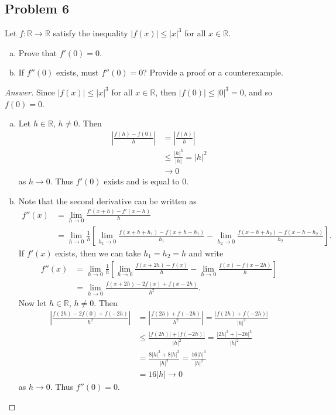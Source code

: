 \documentclass[12pt]{article}
\newcommand{\real}{\mathbb{R}}
\newcommand{\sqbrack}[1]{\left [ #1 \right ]}
\theoremstyle{definition}
\begin{document}
\subsection{Problem 6}
Let $f : \real \to \real$ satisfy the inequality $|f(x)| \leq \left| x \right|^3$ for all $x \in \real$.
\begin{enumerate}[(a)]
    \item Prove that $f'(0) = 0$.
    \item If $f''(0)$ exists, must $f''(0) = 0$? Provide a proof or a counterexample.
\end{enumerate}
\begin{proof}[Answer]
    Since $|f(x)| \leq \left| x \right|^3$ for all $x \in \real$, then $|f(0)| \leq |0|^3 = 0$, and so $f(0) = 0$.
    \begin{enumerate}[(a)]
        \item Let $h \in \real$, $h \neq 0$. Then
        \begin{align*}
            \left| \frac{f(h) - f(0)}{h} \right| & = \left| \frac{f(h)}{h} \right| \\
            & \leq \frac{ |h|^3 }{|h|} = |h|^2 \\
            & \to 0
        \end{align*}
        as $h \to 0$. Thus $f'(0)$ exists and is equal to $0$.
        \item Note that the second derivative can be written as
        \begin{align*}
            f''(x) & = \lim\limits_{h \to 0} \frac{f'(x+h) - f'(x-h)}{h} \\
            & = \lim\limits_{h \to 0} \frac{1}{h} \sqbrack{ \lim\limits_{h_1 \to 0} \frac{ f(x + h + h_1) - f(x + h - h_1) }{h_1} - \lim\limits_{h_2 \to 0} \frac{ f(x - h + h_2) - f(x-h -h_2) }{h_2} }.
        \end{align*}
        If $f'(x)$ exists, then we can take $h_1 = h_2 = h$ and write
        \begin{align*}
            f''(x) & = \lim\limits_{h \to 0} \frac{1}{h} \sqbrack{ \lim\limits_{h \to 0} \frac{ f(x+2h) - f(x) }{h} - \lim\limits_{h \to 0} \frac{ f(x) - f(x-2h) }{h} } \\
            & = \lim\limits_{h \to 0} \frac{ f(x + 2h) - 2f(x) + f(x-2h) }{ h^2 }.
        \end{align*}
        Now let $h \in \real$, $h \neq 0$. Then 
        \begin{align*}
            \left| \frac{ f(2h) - 2f(0) + f(-2h)}{h^2} \right| & = \left| \frac{ f(2h) + f(-2h)}{h^2} \right| = \frac{ | f(2h) + f(-2h) | }{ |h|^2 } \\
            & \leq \frac{ |f(2h)| + |f(-2h)| }{ |h|^2 } = \frac{ |2h|^3 + |-2h|^3 }{ |h|^2 } \\
            & = \frac{8|h|^3 + 8|h|^3}{|h|^2} = \frac{ 16|h|^3 }{|h|^2} \\
            & = 16|h| \to 0
        \end{align*}
        as $h \to 0$. Thus $f''(0) = 0$.
    \end{enumerate}
\end{proof}
\end{document}
